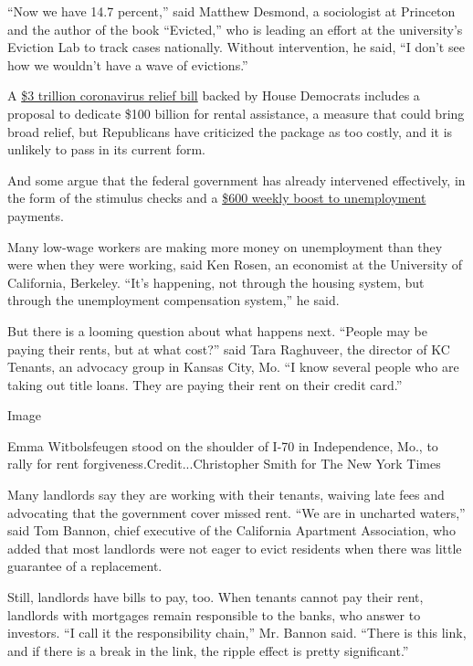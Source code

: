 ``Now we have 14.7 percent,'' said Matthew Desmond, a sociologist at
Princeton and the author of the book ``Evicted,'' who is leading an
effort at the university's Eviction Lab to track cases nationally.
Without intervention, he said, ``I don't see how we wouldn't have a wave
of evictions.''

A
\href{https://www.nytimes3xbfgragh.onion/2020/05/15/us/politics/house-simulus-vote.html}{\$3
trillion coronavirus relief bill} backed by House Democrats includes a
proposal to dedicate \$100 billion for rental assistance, a measure that
could bring broad relief, but Republicans have criticized the package as
too costly, and it is unlikely to pass in its current form.

And some argue that the federal government has already intervened
effectively, in the form of the stimulus checks and a
\href{https://www.nytimes3xbfgragh.onion/interactive/2020/04/23/business/economy/unemployment-benefits-stimulus-coronavirus.html}{\$600
weekly boost to unemployment} payments.

Many low-wage workers are making more money on unemployment than they
were when they were working, said Ken Rosen, an economist at the
University of California, Berkeley. ``It's happening, not through the
housing system, but through the unemployment compensation system,'' he
said.

But there is a looming question about what happens next. ``People may be
paying their rents, but at what cost?'' said Tara Raghuveer, the
director of KC Tenants, an advocacy group in Kansas City, Mo. ``I know
several people who are taking out title loans. They are paying their
rent on their credit card.''

Image

Emma Witbolsfeugen stood on the shoulder of I-70 in Independence, Mo.,
to rally for rent forgiveness.Credit...Christopher Smith for The New
York Times

Many landlords say they are working with their tenants, waiving late
fees and advocating that the government cover missed rent. ``We are in
uncharted waters,'' said Tom Bannon, chief executive of the California
Apartment Association, who added that most landlords were not eager to
evict residents when there was little guarantee of a replacement.

Still, landlords have bills to pay, too. When tenants cannot pay their
rent, landlords with mortgages remain responsible to the banks, who
answer to investors. ``I call it the responsibility chain,'' Mr. Bannon
said. ``There is this link, and if there is a break in the link, the
ripple effect is pretty significant.''

